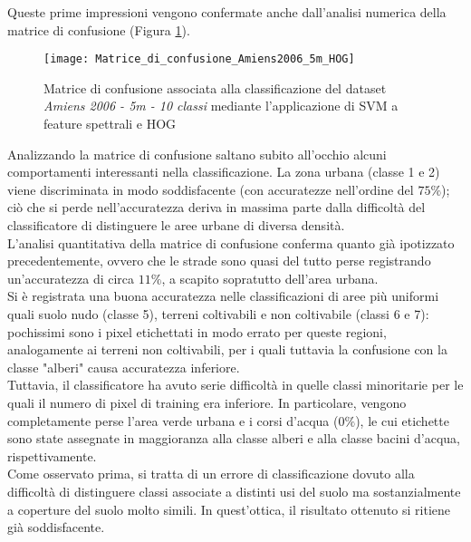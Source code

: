 Queste prime impressioni vengono confermate anche dall'analisi numerica della matrice di confusione (Figura
\ref{fig:Matrice_di_confusione_Amiens2006_5m_HOG}).

\begin{figure}[!ht]

\texttt{[image: Matrice\_di\_confusione\_Amiens2006\_5m\_HOG]}

\caption{Matrice di confusione associata alla classificazione del
dataset \emph{Amiens 2006 - 5m - 10 classi} mediante l'applicazione di SVM a feature spettrali e HOG}

\label{fig:Matrice_di_confusione_Amiens2006_5m_HOG}

\end{figure}

Analizzando la matrice di confusione saltano subito all'occhio alcuni
comportamenti interessanti nella classificazione. La zona urbana
(classe 1 e 2) viene discriminata in modo soddisfacente (con
accuratezze nell'ordine del $75\%$); ciò che si perde nell'accuratezza
deriva in massima parte dalla difficoltà del classificatore di
distinguere le aree urbane di diversa densità.\\

L'analisi quantitativa della matrice di confusione conferma quanto già
ipotizzato precedentemente, ovvero che le strade sono quasi del tutto
perse registrando un'accuratezza di circa $11\%$, a scapito sopratutto
dell'area urbana. \\

Si è registrata una buona accuratezza nelle classificazioni di aree
più uniformi quali suolo nudo (classe 5), terreni coltivabili e non
coltivabile (classi 6 e 7): pochissimi sono i pixel etichettati in
modo errato per queste regioni, analogamente ai terreni non
coltivabili, per i quali tuttavia la confusione con la classe "alberi"
causa accuratezza inferiore.\\

Tuttavia, il classificatore ha avuto serie difficoltà in quelle classi
minoritarie per le quali il numero di pixel di training era inferiore.
In particolare, vengono completamente perse l'area verde urbana e i
corsi d'acqua ($0\%$), le cui etichette sono state assegnate in
maggioranza alla classe alberi e alla classe bacini d'acqua,
rispettivamente.\\

Come osservato prima, si tratta di un errore di classificazione dovuto
alla difficoltà di distinguere classi associate a distinti usi del
suolo ma sostanzialmente a coperture del suolo molto simili. In
quest'ottica, il risultato ottenuto si ritiene già soddisfacente.\\

